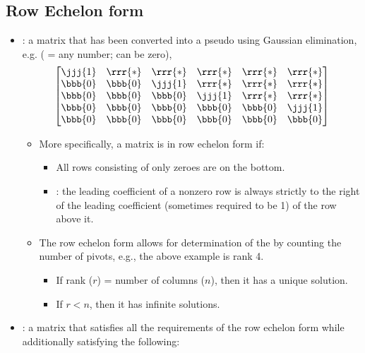 \begin{itemize}
  \subsection{Row Echelon form}\label{Row Echelon form}
  \begin{itemize}
    \item {}: a matrix that has been converted into a pseudo \hyperref[Diagonal and Triagnular Matrices]{} using Gaussian elimination, e.g. (\rrr{*} = any number; can be zero),
    \[%
    \begin{bmatrix}
      \jjj{1} & \rrr{*} & \rrr{*} & \rrr{*} & \rrr{*} & \rrr{*} \\
      \bbb{0} & \bbb{0} & \jjj{1} & \rrr{*} & \rrr{*} & \rrr{*} \\
      \bbb{0} & \bbb{0} & \bbb{0} & \jjj{1} & \rrr{*} & \rrr{*} \\
      \bbb{0} & \bbb{0} & \bbb{0} & \bbb{0} & \bbb{0} & \jjj{1} \\
      \bbb{0} & \bbb{0} & \bbb{0} & \bbb{0} & \bbb{0} & \bbb{0} \\
    \end{bmatrix}
    \]%
    \begin{itemize}
      \item More specifically, a matrix is in row echelon form if:
      \begin{itemize}
        \item All rows consisting of only zeroes are on the bottom.
        \item {}: the leading coefficient of a nonzero row is always strictly to the right of the leading coefficient (sometimes required to be 1) of the row above it. 
      \end{itemize}
      \item The row echelon form allows for determination of the \hyperref[Matrix Rank]{} by counting the number of pivots, e.g., the above example is rank 4.
        \begin{itemize}
          \item If rank (\(r\)) =  number of columns (\(n\)), then it has a unique solution. 
          \item If \(r < n\), then it has infinite solutions.
        \end{itemize}
    \end{itemize}
    \item {} : a matrix that satisfies all the requirements of the row echelon form while additionally satisfying the following:

\end{itemize}
\end{itemize}
